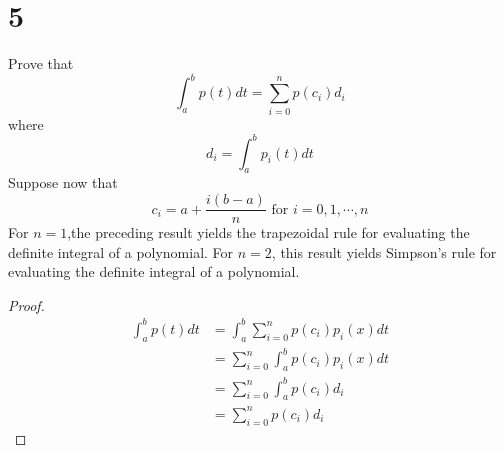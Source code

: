 \documentclass[11pt]{scrartcl}
\begin{document}
\section{5}
Prove that $$\int_a^b p(t)dt = \sum_{i=0}^n p(c_i)d_i$$
where $$d_i= \int_a^b p_i(t)dt$$
Suppose now that $$c_i = a + \frac{i(b-a)}{n} \text{ for } i = 0, 1, \cdots, n $$
For $n = 1$,the preceding result yields the trapezoidal rule for evaluating the definite integral of a polynomial. For
$n = 2$, this result yields Simpson’s rule for evaluating the definite integral of a polynomial.
\begin{proof}
	\begin{align*}
	\int_a^b p(t)dt & = \int_a^b \sum_{i=0}^n p(c_i)p_i(x)dt\\
	& = \sum_{i=0}^n \int_a^b p(c_i)p_i(x)dt\\
	& = \sum_{i=0}^n \int_a^b p(c_i)d_i \\
	& = \sum_{i=0}^n p(c_i)d_i 
	\end{align*}
\end{proof}
\end{document}
